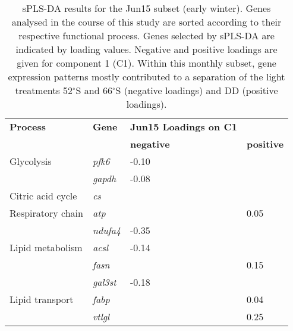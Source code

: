 \begin{table}[]
\caption{sPLS-DA results for the Jun15 subset (early winter). Genes analysed in
        the course of this study are sorted according to their respective
        functional process. Genes selected by sPLS-DA are indicated by loading
        values. Negative and positive loadings are given for component 1 (C1).
        Within this monthly subset, gene expression patterns mostly contributed
        to a separation of the light treatments 52$^{\circ}$S and 66$^\circ$S (negative
        loadings) and DD (positive loadings).}
\label{pub3_tab5}
\begin{tabular}{@{}llll@{}}
\toprule
\textbf{Process}                      & \textbf{Gene}   & \textbf{Jun15 Loadings on C1} &                   \\
                                      &                 & \textbf{negative}             & \textbf{positive} \\ \midrule
Glycolysis                            & \textit{pfk6}   & \cellcolor[HTML]{C0C0C0}-0.10 &                   \\
                                      & \textit{gapdh}  & \cellcolor[HTML]{C0C0C0}-0.08 &                   \\
Citric acid cycle                     & \textit{cs}     & \cellcolor[HTML]{C0C0C0}      &                   \\
Respiratory chain                     & \textit{atp}    & \cellcolor[HTML]{C0C0C0}      & 0.05              \\
                                      & \textit{ndufa4} & \cellcolor[HTML]{C0C0C0}-0.35 &                   \\
Lipid metabolism                      & \textit{acsl}   & \cellcolor[HTML]{C0C0C0}-0.14 &                   \\
                                      & \textit{fasn}   & \cellcolor[HTML]{C0C0C0}      & 0.15              \\
                                      & \textit{gal3st} & \cellcolor[HTML]{C0C0C0}-0.18 &                   \\
Lipid transport                       & \textit{fabp}   & \cellcolor[HTML]{C0C0C0}      & 0.04              \\
                                      & \textit{vtlgl}  & \cellcolor[HTML]{C0C0C0}      & 0.25              \\

\end{tabular}
\end{table}
